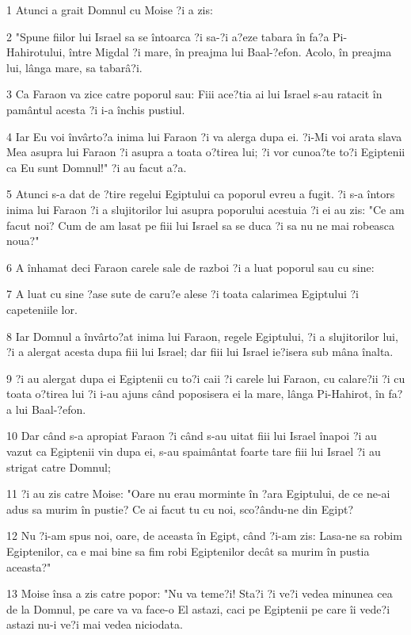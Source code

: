 \par 1 Atunci a grait Domnul cu Moise ?i a zis:
\par 2 "Spune fiilor lui Israel sa se întoarca ?i sa-?i a?eze tabara în fa?a Pi-Hahirotului, între Migdal ?i mare, în preajma lui Baal-?efon. Acolo, în preajma lui, lânga mare, sa tabarâ?i.
\par 3 Ca Faraon va zice catre poporul sau: Fiii ace?tia ai lui Israel s-au ratacit în pamântul acesta ?i i-a închis pustiul.
\par 4 Iar Eu voi învârto?a inima lui Faraon ?i va alerga dupa ei. ?i-Mi voi arata slava Mea asupra lui Faraon ?i asupra a toata o?tirea lui; ?i vor cunoa?te to?i Egiptenii ca Eu sunt Domnul!" ?i au facut a?a.
\par 5 Atunci s-a dat de ?tire regelui Egiptului ca poporul evreu a fugit. ?i s-a întors inima lui Faraon ?i a slujitorilor lui asupra poporului acestuia ?i ei au zis: "Ce am facut noi? Cum de am lasat pe fiii lui Israel sa se duca ?i sa nu ne mai robeasca noua?"
\par 6 A înhamat deci Faraon carele sale de razboi ?i a luat poporul sau cu sine:
\par 7 A luat cu sine ?ase sute de caru?e alese ?i toata calarimea Egiptului ?i capeteniile lor.
\par 8 Iar Domnul a învârto?at inima lui Faraon, regele Egiptului, ?i a slujitorilor lui, ?i a alergat acesta dupa fiii lui Israel; dar fiii lui Israel ie?isera sub mâna înalta.
\par 9 ?i au alergat dupa ei Egiptenii cu to?i caii ?i carele lui Faraon, cu calare?ii ?i cu toata o?tirea lui ?i i-au ajuns când poposisera ei la mare, lânga Pi-Hahirot, în fa?a lui Baal-?efon.
\par 10 Dar când s-a apropiat Faraon ?i când s-au uitat fiii lui Israel înapoi ?i au vazut ca Egiptenii vin dupa ei, s-au spaimântat foarte tare fiii lui Israel ?i au strigat catre Domnul;
\par 11 ?i au zis catre Moise: "Oare nu erau morminte în ?ara Egiptului, de ce ne-ai adus sa murim în pustie? Ce ai facut tu cu noi, sco?ându-ne din Egipt?
\par 12 Nu ?i-am spus noi, oare, de aceasta în Egipt, când ?i-am zis: Lasa-ne sa robim Egiptenilor, ca e mai bine sa fim robi Egiptenilor decât sa murim în pustia aceasta?"
\par 13 Moise însa a zis catre popor: "Nu va teme?i! Sta?i ?i ve?i vedea minunea cea de la Domnul, pe care va va face-o El astazi, caci pe Egiptenii pe care îi vede?i astazi nu-i ve?i mai vedea niciodata.

